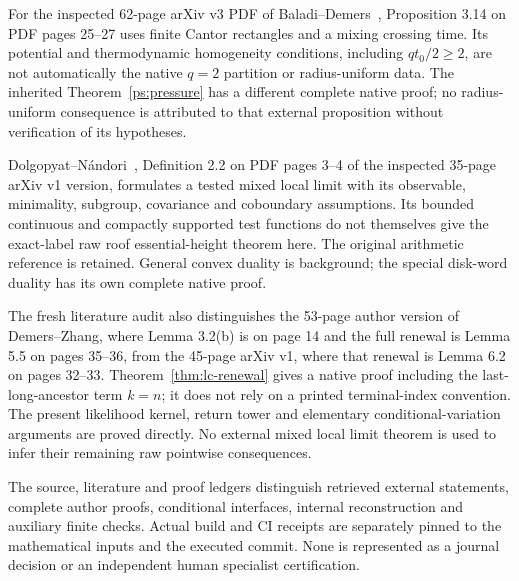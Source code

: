 For the inspected 62-page arXiv v3 PDF of
Baladi--Demers~\cite{BDPressure}, Proposition 3.14 on PDF pages
25--27 uses finite Cantor rectangles and a mixing crossing time.
Its potential and thermodynamic homogeneity conditions, including
$qt_0/2\ge2$, are not automatically the native $q=2$ partition or
radius-uniform data. The inherited Theorem~\ref{ps:pressure} has a different
complete native proof; no radius-uniform consequence is attributed
to that external proposition without verification of its hypotheses.

Dolgopyat--N\'andori~\cite{DNFlow}, Definition 2.2 on PDF pages
3--4 of the inspected 35-page arXiv v1 version, formulates a tested
mixed local limit with its observable, minimality, subgroup,
covariance and coboundary assumptions. Its bounded continuous and
compactly supported test functions do not themselves give the
exact-label raw roof essential-height theorem here. The original
arithmetic reference is retained. General convex duality
\cite{BVNotes} is background; the special disk-word duality has
its own complete native proof.

The fresh literature audit also distinguishes the 53-page
author version of Demers--Zhang, where Lemma 3.2(b) is on page 14
and the full renewal is Lemma 5.5 on pages 35--36, from the
45-page arXiv v1, where that renewal is Lemma 6.2 on pages 32--33.
Theorem~\ref{thm:lc-renewal} gives a native proof including the
last-long-ancestor term $k=n$; it does not rely on a printed
terminal-index convention. The present likelihood kernel,
return tower and elementary conditional-variation arguments are
proved directly. No external mixed local limit theorem is used
to infer their remaining raw pointwise consequences.

The source, literature and proof ledgers distinguish retrieved
external statements, complete author proofs, conditional interfaces,
internal reconstruction and auxiliary finite checks. Actual build
and CI receipts are separately pinned to the mathematical inputs
and the executed commit. None is represented as a journal decision
or an independent human specialist certification.
